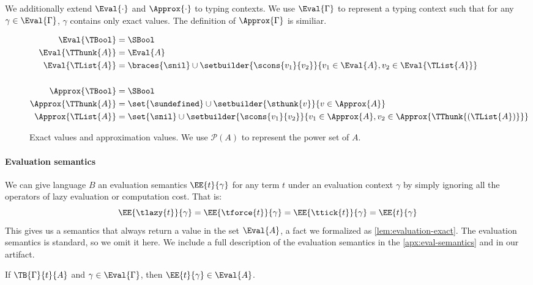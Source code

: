 We additionally extend $\Eval{\cdot}$ and $\Approx{\cdot}$ to typing contexts.
We use $\Eval{\Gamma}$ to represent a typing context such that for any
$\gamma \in \Eval{\Gamma}$, $\gamma$ contains only exact values. The definition
of $\Approx{\Gamma}$ is similiar.

\begin{figure}[t]
\begin{center}
  \begin{align*}
    \Eval{\TBool} &= \SBool \\
    \Eval{\TThunk{A}} &= \Eval{A} \\
    \Eval{\TList{A}} &= \braces{\snil} \cup \setbuilder{\scons{v_1}{v_2}}{v_1 \in \Eval{A}, v_2 \in \Eval{\TList{A}}} \\ \\
    \Approx{\TBool} &= \SBool \\
    \Approx{\TThunk{A}} &= \set{\sundefined} \cup \setbuilder{\sthunk{v}}{v \in \Approx{A}} \\
    \Approx{\TList{A}} &= \set{\snil} \cup \setbuilder{\scons{v_1}{v_2}}{v_1 \in \Approx{A}, v_2 \in \Approx{\TThunk{(\TList{A})}}}
  \end{align*}
\end{center}
\caption{Exact values and approximation values. We use $\mathcal{P}(A)$ to
  represent the power set of $A$.}\label{fig:exact-approx}
\end{figure}

\paragraph{Evaluation semantics}
We can give language $B$ an evaluation semantics $\EE{t}{\gamma}$ for any term
$t$ under an evaluation context $\gamma$ by simply ignoring all the operators of
lazy evaluation or computation cost. That is:
$$\EE{\tlazy{t}}{\gamma} = \EE{\tforce{t}}{\gamma} = \EE{\ttick{t}}{\gamma} = \EE{t}{\gamma}$$
This gives us a semantics that always return a value in the set \( \Eval{A} \),
a fact we formalized as \cref{lem:evaluation-exact}. The evaluation semantics is
standard, so we omit it here. We include a full description of the evaluation
semantics in the \cref{apx:eval-semantics} and in our artifact.

\begin{lemma}\label{lem:evaluation-exact}
  If \( \TB{\Gamma}{t}{A} \) and \( \gamma \in \Eval{\Gamma} \), then \( \EE{t}{\gamma} \in \Eval{A} \).
\end{lemma}

